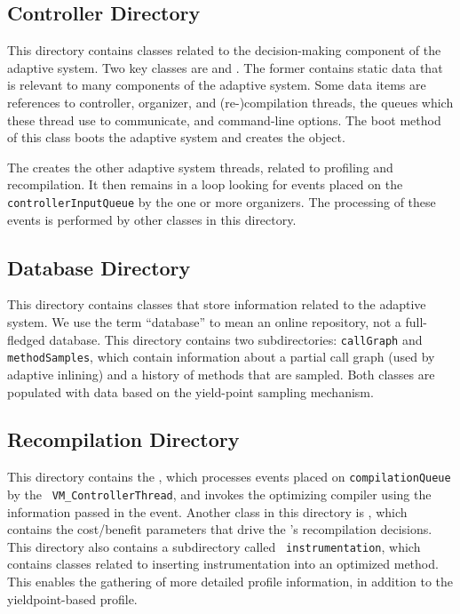 \subsection{Controller Directory}
This directory contains classes related to 
the decision-making component of the adaptive system.
Two key classes are 
 and 
.  
The former contains static data that
is relevant to many components of the adaptive system.  Some data
items are references to controller, organizer, and
(re-)compilation threads, the queues which these thread use to 
communicate, and command-line options.  The boot method of this class
boots the adaptive system and creates the  
object. 

The  creates
the other adaptive system 
threads, related to profiling and recompilation.  It then remains in a
loop looking for events placed on the {\tt controllerInputQueue} by
the one or more organizers.  The processing of these events is
performed by other classes in this directory.

\subsection{Database Directory}
This directory contains classes that store information related to the
adaptive system.  We use the term ``database'' to mean an online
repository, not a full-fledged database. This directory contains two
subdirectories: 
{\tt callGraph} and {\tt methodSamples}, which contain information
about a partial call graph (used by adaptive inlining) and a history
of methods that are sampled.  Both classes are populated with data based
on the yield-point sampling mechanism.

\subsection{Recompilation Directory}
This directory contains the , which 
processes
events placed on {\tt compilationQueue} by the {\tt
VM\_ControllerThread}, and invokes the optimizing compiler using the
information passed in the event.  Another class in this directory is
, which contains the cost/benefit
parameters that drive the 's recompilation 
decisions. This directory also contains a subdirectory called {\tt
instrumentation}, which contains classes related to inserting
instrumentation into an optimized method.  This enables the gathering
of more detailed profile information, in addition to the
yieldpoint-based profile.

